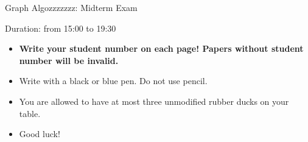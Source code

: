 \documentclass[answers]{exercises}
\begin{document}
\begin{center}
	{\LARGE Graph Algozzzzzzz: Midterm Exam}

	\vspace{3mm}
	{\large Duration: from 15:00 to 19:30}
\end{center}
\vspace{5mm}

\begin{instructions}
	\begin{itemize}
		\item \textbf{Write your student number on each page! Papers without student number will be invalid.}
		\item Write with a black or blue pen. Do not use pencil.
		\item You are allowed to have at most three unmodified rubber ducks on your table.
		\item Good luck!
	\end{itemize}
\end{instructions}
\end{document}
